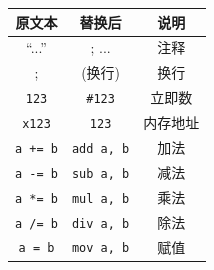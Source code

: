 \begin{center}
    \begin{tabular}{c|c|c}
        \hline
        \textbf{原文本}                                & \textbf{替换后}                                                                                                               & \textbf{说明}      \\
        \hline
        ``...''                                     & ; ...                                                                                                                      & 注释               \\[5pt]
        ;                                           & (换行)                                                                                                                       & 换行               \\[5pt]
        \texttt{123}                                & \texttt{\#123}                                                                                                             & 立即数              \\[5pt]
        \texttt{x123}                               & \texttt{123}                                                                                                               & 内存地址             \\[5pt]
        \texttt{a += b}                             & \texttt{add a, b}                                                                                                          & 加法               \\[5pt]
        \texttt{a -= b}                             & \texttt{sub a, b}                                                                                                          & 减法               \\[5pt]
        \texttt{a *= b}                             & \texttt{mul a, b}                                                                                                          & 乘法               \\[5pt]
        \texttt{a /= b}                             & \texttt{div a, b}                                                                                                          & 除法               \\[5pt]
        \texttt{a = b}                              & \texttt{mov a, b}                                                                                                          & 赋值               \\[5pt]

\end{tabular}
\end{center}
